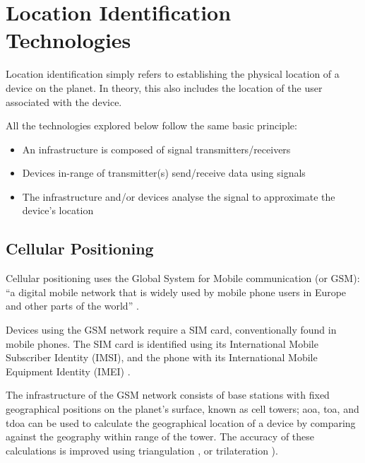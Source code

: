 \section{Location Identification Technologies}

Location identification simply refers to establishing the
physical location of a device on the planet.
In theory, this also includes the location of the user
associated with the device.

All the technologies explored below follow the same basic
principle: 

\begin{itemize} 

  \item An infrastructure is composed of signal
        transmitters/receivers			

  \item Devices in-range of transmitter(s) send/receive data
        using signals 

  \item The infrastructure and/or devices analyse the signal
        to approximate the device's location 

\end{itemize} 

\subsection{Cellular Positioning} \label{ss:cellPos}
Cellular positioning uses the Global System for Mobile
communication (or GSM): \enquote{a digital mobile network
  that is widely used by mobile phone users in Europe and
  other parts of the world} \parencite{whatIsGSM}.

Devices using the GSM network require a SIM card,
conventionally found in mobile phones.
The SIM card is identified using its International Mobile
Subscriber Identity (IMSI), and the phone with its
International Mobile Equipment Identity (IMEI)
\parencite{trackingSuspectByPhone}.

The infrastructure of the GSM network consists of base
stations with fixed geographical positions on the planet's
surface, known as cell towers; \gls{aoa}, \gls{toa}, and
\gls{tdoa} can be used to calculate the geographical
location of a device by comparing against the geography
within range of the tower.
The accuracy of these calculations is improved using
\gls{triangulation} \parencite{howCellTowerTriWorks}, or
\gls{trilateration} \parencite{suveryOfCellPos}).

